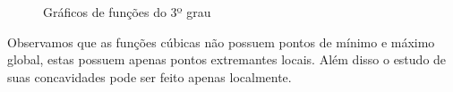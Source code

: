 \begin{itemize}
   \begin{figure}[H]
   \caption{Gráficos de funções do 3º grau}
  \end{figure}

 Observamos que as funções cúbicas não possuem pontos de mínimo e máximo global, estas possuem apenas pontos extremantes locais. Além disso o estudo de suas concavidades pode ser feito apenas localmente.

 \end{itemize}

